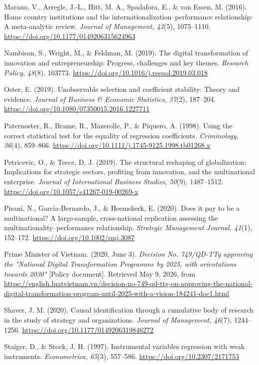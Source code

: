 \documentclass[12pt,a4paper]{article}
\begin{document}
Marano, V., Arregle, J.-L., Hitt, M. A., Spadafora, E., \& van Essen, M.
(2016). Home country institutions and the
internationalization--performance relationship: A meta-analytic review.
\emph{Journal of Management, 42}(5), 1075--1110.
\url{https://doi.org/10.1177/0149206315624963}

Nambisan, S., Wright, M., \& Feldman, M. (2019). The digital
transformation of innovation and entrepreneurship: Progress, challenges
and key themes. \emph{Research Policy, 48}(8), 103773.
\url{https://doi.org/10.1016/j.respol.2019.03.018}

Oster, E. (2019). Unobservable selection and coefficient stability:
Theory and evidence. \emph{Journal of Business \& Economic Statistics,
37}(2), 187--204. \url{https://doi.org/10.1080/07350015.2016.1227711}

Paternoster, R., Brame, R., Mazerolle, P., \& Piquero, A. (1998). Using
the correct statistical test for the equality of regression
coefficients. \emph{Criminology, 36}(4), 859--866.
\url{https://doi.org/10.1111/j.1745-9125.1998.tb01268.x}

Petricevic, O., \& Teece, D. J. (2019). The structural reshaping of
globalization: Implications for strategic sectors, profiting from
innovation, and the multinational enterprise. \emph{Journal of
International Business Studies, 50}(9), 1487--1512.
\url{https://doi.org/10.1057/s41267-019-00269-x}

Pisani, N., Garcia-Bernardo, J., \& Heemskerk, E. (2020). Does it pay to
be a multinational? A large-sample, cross-national replication assessing
the multinationality--performance relationship. \emph{Strategic
Management Journal, 41}(1), 152--172.
\url{https://doi.org/10.1002/smj.3087}

Prime Minister of Vietnam. (2020, June 3). \emph{Decision No. 749/QD-TTg
approving the "National Digital Transformation Programme by 2025, with
orientations towards 2030"} {[}Policy document{]}. Retrieved May 9,
2026, from
\url{https://english.luatvietnam.vn/decision-no-749-qd-ttg-on-approving-the-national-digital-transformation-program-until-2025-with-a-vision-184241-doc1.html}

Shaver, J. M. (2020). Causal identification through a cumulative body of
research in the study of strategy and organizations. \emph{Journal of
Management, 46}(7), 1244--1256.
\url{https://doi.org/10.1177/0149206319846272}

Staiger, D., \& Stock, J. H. (1997). Instrumental variables regression
with weak instruments. \emph{Econometrica, 65}(3), 557--586.
\url{https://doi.org/10.2307/2171753}
\end{document}
